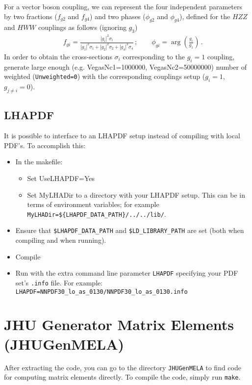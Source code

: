 \documentclass[aps,superscriptaddress,nofootinbib]{revtex4}
\begin{document}
For a vector boson coupling, we can represent the four independent parameters by two  fractions
($f_{g2}$ and $f_{g4}$) and two phases ($\phi_{g2}$ and $\phi_{g4}$), defined for the $HZZ$
and $HWW$ couplings as follows (ignoring $g_3$)
%
\begin{eqnarray}
&& f_{gi} =  \frac{|g^{}_{i}|^2\sigma_i}{|g^{}_{1}|^2\sigma_1+|g^{}_{2}|^2\sigma_2+|g^{}_{4}|^2\sigma_4}\,;
~~~~~~~~~
 \phi_{gi} = \arg\left(\frac{g_i}{g_1}\right)\,.
\nonumber
\label{eq:fractions}
\end{eqnarray}
%
In order to obtain the cross-sections $\sigma_i$ corresponding to the $g^{}_{i}=1$ coupling,
generate large enough (e.g. VegasNc1=1000000, VegasNc2=50000000) number of weighted
({\tt Unweighted=0}) with the corresponding couplings setup ($g^{}_{i}=1$, $g^{}_{j\ne i}=0$).

\subsection{LHAPDF}

It is possible to interface to an LHAPDF setup instead of compiling with local PDF's.  To accomplish this:

\begin{itemize}
\item In the makefile:
\begin{itemize}
\item Set UseLHAPDF=Yes
\item Set MyLHADir to a directory with your LHAPDF setup.  This can be in terms of environment variables; for example \verb|MyLHADir=${LHAPDF_DATA_PATH}/../../lib/|.
\end{itemize}
\item Ensure that \verb|$LHAPDF_DATA_PATH| and \verb|$LD_LIBRARY_PATH| are set (both when compiling and when running).
\item Compile
\item Run with the extra command line parameter \verb|LHAPDF| specifying your PDF set's \verb|.info| file.  For example: \verb|LHAPDF=NNPDF30_lo_as_0130/NNPDF30_lo_as_0130.info|
\end{itemize}


\section{ JHU Generator Matrix Elements (JHUGenMELA)}

After extracting the code, you can go to the directory \verb|JHUGenMELA| to find code for computing matrix elements directly.
To compile the code, simply run \texttt{make}.
\end{document}
